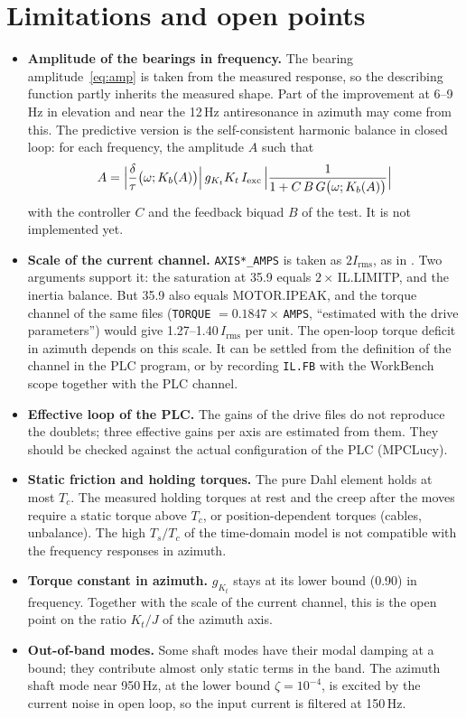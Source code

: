 \documentclass[10pt,a4paper]{article}
\numberwithin{equation}{section}
\begin{document}
\section{Limitations and open points}\label{sec:limits}
\begin{itemize}
\item \textbf{Amplitude of the bearings in frequency.} The bearing amplitude~\eqref{eq:amp} is taken from the measured response, so the describing function partly inherits the measured shape. Part of the improvement at 6--9\,Hz in elevation and near the 12\,Hz antiresonance in azimuth may come from this. The predictive version is the self-consistent harmonic balance in closed loop: for each frequency, the amplitude $A$ such that
\[A=\Bigl|\frac{\delta}{\tau}\bigl(\omega;K_b(A)\bigr)\Bigr|\,g_{K_t}K_t\,I_\mathrm{exc}\,\Bigl|\frac{1}{1+C\,B\,G\bigl(\omega;K_b(A)\bigr)}\Bigr|\]
with the controller $C$ and the feedback biquad $B$ of the test. It is not implemented yet.
\item \textbf{Scale of the current channel.} \texttt{AXIS*\_AMPS} is taken as $2I_\mathrm{rms}$, as in . Two arguments support it: the saturation at 35.9 equals $2\times$\,IL.LIMITP, and the inertia balance. But 35.9 also equals MOTOR.IPEAK, and the torque channel of the same files (\texttt{TORQUE} $=0.1847\times$\,\texttt{AMPS}, ``estimated with the drive parameters'') would give 1.27--1.40\,$I_\mathrm{rms}$ per unit. The open-loop torque deficit in azimuth depends on this scale. It can be settled from the definition of the channel in the PLC program, or by recording \texttt{IL.FB} with the WorkBench scope together with the PLC channel.
\item \textbf{Effective loop of the PLC.} The gains of the drive files do not reproduce the doublets; three effective gains per axis are estimated from them. They should be checked against the actual configuration of the PLC (MPCLucy).
\item \textbf{Static friction and holding torques.} The pure Dahl element holds at most $T_c$. The measured holding torques at rest and the creep after the moves require a static torque above $T_c$, or position-dependent torques (cables, unbalance). The high $T_s/T_c$ of the time-domain model is not compatible with the frequency responses in azimuth.
\item \textbf{Torque constant in azimuth.} $g_{K_t}$ stays at its lower bound (0.90) in frequency. Together with the scale of the current channel, this is the open point on the ratio $K_t/J$ of the azimuth axis.
\item \textbf{Out-of-band modes.} Some shaft modes have their modal damping at a bound; they contribute almost only static terms in the band. The azimuth shaft mode near 950\,Hz, at the lower bound $\zeta=10^{-4}$, is excited by the current noise in open loop, so the input current is filtered at 150\,Hz.
\end{itemize}
\end{document}
